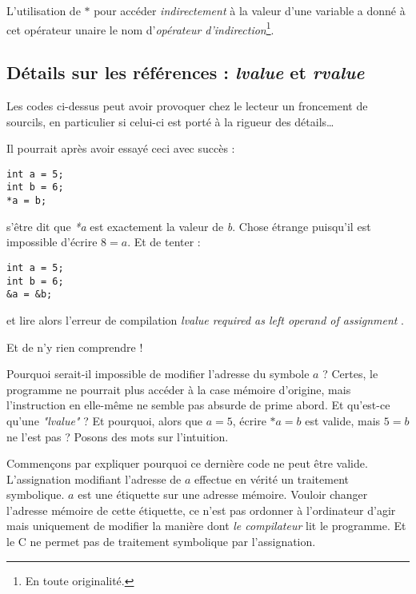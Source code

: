 \documentclass[../../../main.tex]{subfiles}
\begin{document}
\begin{minipage}{\textwidth}
	\begin{center}
		
	\end{center}
\end{minipage}

L'utilisation de $\ast$ pour accéder \textit{indirectement} à la valeur d'une variable a donné à cet opérateur unaire le nom d'\textit{opérateur d'indirection}\footnote{En toute originalité.}.

\subsection{Détails sur les références : \textit{lvalue} et \textit{rvalue}}
\label{sub:lvalue_et_rvalue}
Les codes ci-dessus peut avoir provoquer chez le lecteur un froncement de sourcils, en particulier si celui-ci est porté à la rigueur des détails\dots

Il pourrait après avoir essayé ceci avec succès :
\begin{verbatim}
int a = 5;
int b = 6;
*a = b;
\end{verbatim}
s'être dit que \textit{*a} est exactement la valeur de \textit{b}. Chose étrange puisqu'il est impossible d'écrire $8 = a$. Et de tenter :
\begin{verbatim}
int a = 5;
int b = 6;
&a = &b;
\end{verbatim}
et lire alors l'erreur de compilation \textit{\og lvalue required as left operand of assignment \fg}.

Et de n'y rien comprendre !

Pourquoi serait-il impossible de modifier l'adresse du symbole $a$ ? Certes, le programme ne pourrait plus accéder à la case mémoire d'origine, mais l'instruction en elle-même ne semble pas absurde de prime abord. Et qu'est-ce qu'une \textit{"lvalue"} ? Et pourquoi, alors que $a = 5$, écrire $*a = b$ est valide, mais $5 = b$ ne l'est pas ?\newline
Posons des mots sur l'intuition.

Commençons par expliquer pourquoi ce dernière code ne peut être valide. L'assignation modifiant l'adresse de $a$ effectue en vérité un traitement symbolique. $a$ est une étiquette sur une adresse mémoire. Vouloir changer l'adresse mémoire de cette étiquette, ce n'est pas ordonner à l'ordinateur d'agir mais uniquement de modifier la manière dont \textit{le compilateur} lit le programme. Et le C ne permet pas de traitement symbolique par l'assignation.
\end{document}
